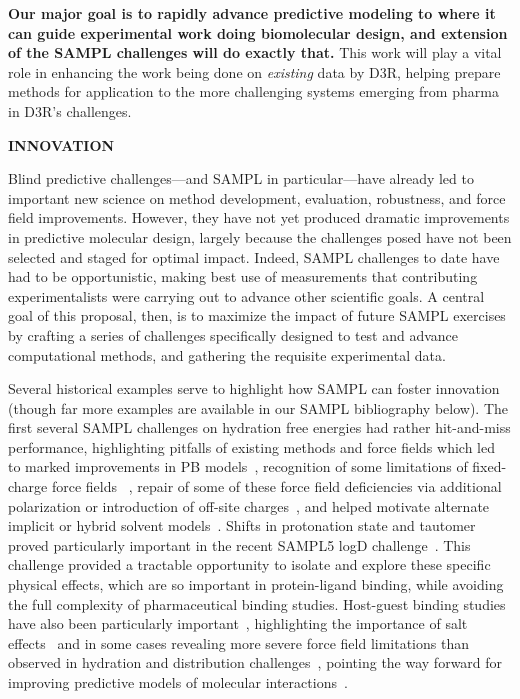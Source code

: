 \documentclass[11pt]{article}
\begin{document}
\textbf{Our major goal is to rapidly advance predictive modeling to where it can guide experimental work doing biomolecular design, and extension of the SAMPL challenges will do exactly that.} This work will play a vital role in enhancing the work being done on \emph{existing} data by D3R, helping prepare methods for application to the more challenging systems emerging from pharma in D3R's challenges. 

{\large \bf INNOVATION}

Blind predictive challenges---and SAMPL in particular---have already led to important new science on method development, evaluation, robustness, and force field improvements. 
However, they have not yet produced dramatic improvements in predictive molecular design, largely because the challenges posed have not been selected and staged for optimal impact. 
Indeed, SAMPL challenges to date have had to be opportunistic, making best use of measurements that contributing experimentalists were carrying out to advance other scientific goals. 
A central goal of this proposal, then, is to maximize the impact of future SAMPL exercises by crafting a series of challenges specifically designed to test and advance computational methods, and gathering the requisite experimental data. 

Several historical examples serve to highlight how SAMPL can foster innovation (though far more examples are available in our SAMPL bibliography below). 
The first several SAMPL challenges on hydration free energies had rather hit-and-miss performance, highlighting pitfalls of existing methods and force fields which led to marked improvements in PB models~\cite{nicholls_samp1_2009, ellingson_analysis_2010,ellingson_efficient_2014}, recognition of some limitations of fixed-charge force fields ~\cite{mobley_alchemical_2012, Fennell:2014:J.Phys.Chem.B},
repair of some of these force field deficiencies via additional polarization or introduction of off-site charges~\cite{mobley_alchemical_2012, Fennell:2014:J.Phys.Chem.B, paranahewage_predicting_2016},
and helped motivate alternate implicit or hybrid solvent models~\cite{sulea_predicting_2011, li_testing_2014, brini_adapting_2016}.
Shifts in protonation state and tautomer proved particularly important in the recent SAMPL5 logD challenge~\cite{bannan_blind_2016, klamt_prediction_2016}.
This challenge provided a tractable opportunity to isolate and explore these specific physical effects, which are so important in protein-ligand binding, while avoiding the full complexity of pharmaceutical binding studies.
Host-guest binding studies have also been particularly important~\cite{mobley_predicting_2016},
highlighting the importance of salt effects~\cite{yin_overview_2016, muddana_blind_2014, mobley_predicting_2016}
and in some cases revealing more severe force field limitations than observed in hydration and distribution challenges~\cite{yin_sampl5_2016, muddana_sampl4_2014-1}, pointing the way forward for improving predictive models of molecular interactions~\cite{yin_toward_2015, mobley_predicting_2016}.
\end{document}
